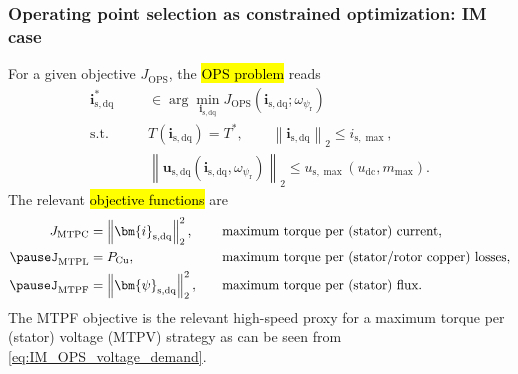 \begin{frame}
    \frametitle{Operating point selection as constrained optimization: IM case}
    For a given objective $J_{\mathrm{OPS}}$, the \hl{OPS problem} reads
    \begin{equation}
        \begin{aligned}
            \bm{i}_{\mathrm{s,dq}}^{*}
             & \in
            \arg\min_{\bm{i}_{\mathrm{s,dq}}}
            J_{\mathrm{OPS}}\left(\bm{i}_{\mathrm{s,dq}};\omega_{\psi_\mathrm{r}}\right) \\[-0.5mm]
            \text{s.t.}\qquad
             & T\left(\bm{i}_{\mathrm{s,dq}}\right)=T^*,
            \qquad
            \left\|\bm{i}_{\mathrm{s,dq}}\right\|_2\le i_{\mathrm{s},\max},              \\[-0.5mm]
             & \left\|\bm{u}_{\mathrm{s,dq}}
            \left(\bm{i}_{\mathrm{s,dq}},\omega_{\psi_\mathrm{r}}\right)\right\|_2
            \le u_{\mathrm{s},\max}(u_{\mathrm{dc}},m_{\max}).
        \end{aligned}
        \label{eq:IM_OPS_problem_v14}
    \end{equation}\pause%
    The relevant \hl{objective functions} are
    \begin{equation}
        \begin{aligned}
            J_{\mathrm{MTPC}} & =\left\|\bm{i}_{\mathrm{s,dq}}\right\|_2^2,
                              & \quad                                          & \text{maximum torque per (stator) current},             \\\pause%
            J_{\mathrm{MTPL}} & =P_{\mathrm{Cu}},
                              &                                                & \text{maximum torque per (stator/rotor copper) losses}, \\\pause%
            J_{\mathrm{MTPF}} & =\left\|\bm{\psi}_{\mathrm{s,dq}}\right\|_2^2,
                              &                                                & \text{maximum torque per (stator) flux}.
        \end{aligned}
        \label{eq:IM_OPS_objectives_v14}
    \end{equation}\pause%
    The MTPF objective is the relevant high-speed proxy for a maximum torque per (stator) voltage (MTPV) strategy as can be seen from \eqref{eq:IM_OPS_voltage_demand}.
\end{frame}

